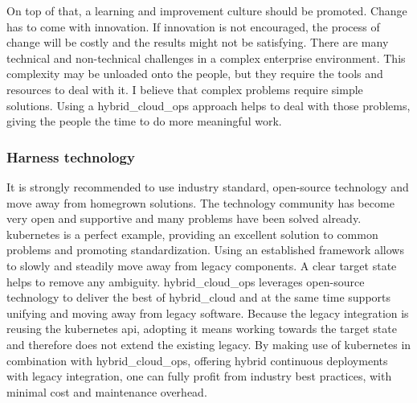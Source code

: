 \documentclass[../main.tex]{subfiles}
\begin{document}
    On top of that, a learning and improvement culture should be promoted.
    Change has to come with innovation.
    If innovation is not encouraged, the process of change will be costly and the results might not be satisfying.
    There are many technical and non-technical challenges in a complex enterprise environment.
    This complexity may be unloaded onto the people, but they require the tools and resources to deal with it.
    I believe that complex problems require simple solutions.
    Using a \gls{hybrid_cloud_ops} approach helps to deal with those problems, giving the people the time to do more meaningful work.

    \subsubsection{Harness technology}

    It is strongly recommended to use industry standard, open-source technology and move away from homegrown solutions.
    The technology community has become very open and supportive and many problems have been solved already.
    \gls{kubernetes} is a perfect example, providing an excellent solution to common problems and promoting standardization.
    Using an established framework allows to slowly and steadily move away from legacy components.
    A clear target state helps to remove any ambiguity.
    \gls{hybrid_cloud_ops} leverages open-source technology to deliver the best of \gls{hybrid_cloud} and at the same time supports unifying and moving away from legacy software.
    Because the legacy integration is reusing the \gls{kubernetes} \acrshort{api}, adopting it means working towards the target state and therefore does not extend the existing legacy.
    By making use of \gls{kubernetes} in combination with \gls{hybrid_cloud_ops}, offering hybrid continuous deployments with legacy integration, one can fully profit from industry best practices, with minimal cost and maintenance overhead.
\end{document}
